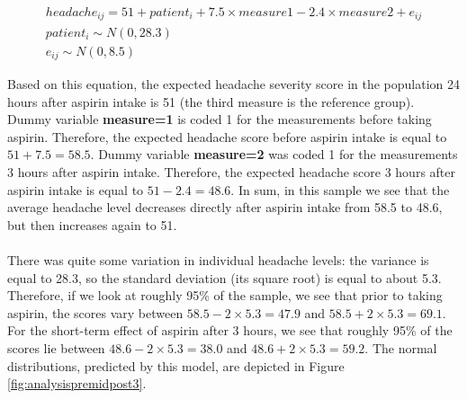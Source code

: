 \documentclass[]{book}\usepackage[]{graphicx}\usepackage[]{color}
\begin{document}
\begin{eqnarray}
headache_{ij} = 51 + patient_i +7.5 \times measure1 - 2.4 \times measure2 + e_{ij} \nonumber\\
patient_i \sim N(0, 28.3)\nonumber\\
e_{ij} \sim N(0, 8.5)\nonumber
\end{eqnarray}

Based on this equation, the expected headache severity score in the population 24 hours after aspirin intake is 51 (the third measure is the reference group). Dummy variable \textbf{measure=1} is coded 1 for the measurements before taking aspirin. Therefore, the expected headache score before aspirin intake is equal to $51+7.5 = 58.5$. Dummy variable \textbf{measure=2} was coded 1 for the measurements 3 hours after aspirin intake. Therefore, the expected headache score 3 hours after aspirin intake is equal to $51 - 2.4 = 48.6$. In sum, in this sample we see that the average headache level decreases directly after aspirin intake from 58.5 to 48.6, but then increases again to 51. 
\\
\\
There was quite some variation in individual headache levels: the variance is equal to 28.3, so the standard deviation (its square root) is equal to about 5.3. Therefore, if we look at roughly 95\% of the sample, we see that prior to taking aspirin, the scores vary between $58.5 -2\times 5.3 = 47.9$ and $58.5 + 2 \times 5.3 = 69.1$. For the short-term effect of aspirin after 3 hours, we see that roughly 95\% of the scores lie between $48.6 -2\times 5.3 = 38.0$ and $48.6 + 2 \times 5.3 = 59.2$. The normal distributions, predicted by this model, are depicted in Figure \ref{fig:analysispremidpost3}.
\end{document}
